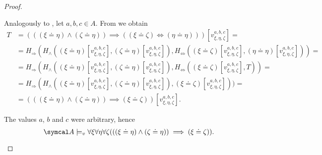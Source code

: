 \begin{proof}
\begin{description}
     Analogously to , let \( a, b, c \in A \). From  we obtain
    \begin{align*}
      T &=
      (((\xi \doteq \eta) \land (\zeta \doteq \eta)) \implies ((\xi \doteq \zeta) \iff (\eta \doteq \eta)))[v_{\xi,\eta,\zeta}^{a,b,c}]
      = \\ &=
      H_\Rightarrow(H_\land((\xi \doteq \eta)[v_{\xi,\eta,\zeta}^{a,b,c}], (\zeta \doteq \eta)[v_{\xi,\eta,\zeta}^{a,b,c}]), H_\Leftrightarrow((\xi \doteq \zeta)[v_{\xi,\eta,\zeta}^{a,b,c}], (\eta \doteq \eta)[v_{\xi,\eta,\zeta}^{a,b,c}]))
      = \\ &=
      H_\Rightarrow(H_\land((\xi \doteq \eta)[v_{\xi,\eta,\zeta}^{a,b,c}], (\zeta \doteq \eta)[v_{\xi,\eta,\zeta}^{a,b,c}]), H_\Leftrightarrow((\xi \doteq \zeta)[v_{\xi,\eta,\zeta}^{a,b,c}], T))
      = \\ &=
      H_\Rightarrow(H_\land((\xi \doteq \eta)[v_{\xi,\eta,\zeta}^{a,b,c}], (\zeta \doteq \eta)[v_{\xi,\eta,\zeta}^{a,b,c}]), (\xi \doteq \zeta)[v_{\xi,\eta,\zeta}^{a,b,c}]))
      = \\ &=
      (((\xi \doteq \eta) \land (\zeta \doteq \eta)) \implies (\xi \doteq \zeta))[v_{\xi,\eta,\zeta}^{a,b,c}].
    \end{align*}

    The values \( a \), \( b \) and \( c \) were arbitrary, hence
    \begin{equation*}
      \Cal{A} \models_v \forall \xi \forall \eta \forall \zeta (((\xi \doteq \eta) \land (\zeta \doteq \eta)) \implies (\xi \doteq \zeta)).
    \end{equation*}
  \end{description}
\end{proof}

